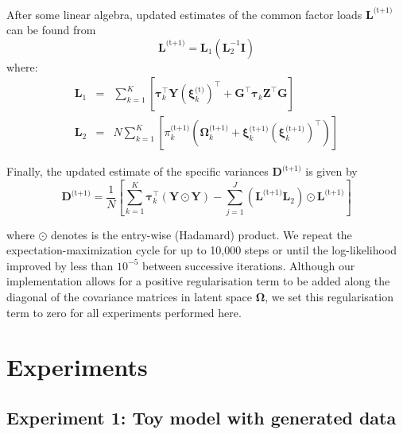 \documentclass[twocolumn]{aastex61}
\newcommand{\vect}[1]{\boldsymbol{\mathbf{#1}}}
\renewcommand{\vec}[1]{\vect{#1}}
\newcommand{\weight}{\pi}
\newcommand{\data}{\textbf{Y}}
\newcommand{\vecdata}{\vec\data}
\newcommand{\nextstep}{^\textrm{(t+1)}}
\newcommand{\thisstep}{^\textrm{(t)}}
\newcommand{\transpose}{^\intercal}
\newcommand{\eye}{\textbf{I}}
\newcommand{\factorloads}{\textbf{L}}
\newcommand{\specificvariance}{\vec{D}}
\newcommand{\scoremeans}{\vec\xi}
\newcommand{\scorecovs}{\vec\Omega}
\newcommand{\NumData}{N}
\newcommand{\NumComponents}{K}
\newcommand{\numcomponents}{k}
\begin{document}
After some linear algebra, updated estimates of the common factor loads $\factorloads\nextstep$
can be found from
\begin{equation}
	\factorloads\nextstep = \factorloads_{1}\left(\factorloads_{2}^{-1}\eye\right)
\end{equation}
\noindent{}where:
\begin{eqnarray}
	\factorloads_1 &=& \sum_{\numcomponents=1}^{\NumComponents}\left[ \vec\tau_\numcomponents\transpose\vecdata\left(\scoremeans_\numcomponents\thisstep\right)\transpose + 
	\vec{G}\transpose\vec\tau_\numcomponents\vec{Z}\transpose\vec{G}\right] \\
	\factorloads_2 &=& N\sum_{\numcomponents=1}^{\NumComponents}\left[\weight_\numcomponents\nextstep\left(\scorecovs_\numcomponents\nextstep + \scoremeans_\numcomponents\nextstep\left(\scoremeans_\numcomponents\nextstep\right)\transpose\right)\right]
\end{eqnarray}


Finally, the updated estimate of the specific variances $\specificvariance\nextstep$ is given
by
\begin{equation}
	\specificvariance\nextstep = \frac{1}{\NumData}\left[\sum^{\NumComponents}_{\numcomponents=1}\vec\tau_\numcomponents\transpose\left(\vecdata\odot\vecdata\right) - \sum_{j=1}^{J}\left(\factorloads\nextstep\factorloads_2\right)\odot\factorloads\nextstep\right]
\end{equation}

\noindent{}where $\odot$ denotes is the entry-wise (Hadamard) product. We repeat
the expectation-maximization cycle for up to 10,000 steps or until the log-likelihood
improved by less than $10^{-5}$ between successive iterations. Although our implementation
allows for a positive regularisation term to be added along the diagonal of the covariance
matrices in latent space $\scorecovs$, we set this regularisation term to zero for all
experiments performed here.


\section{Experiments} \label{sec:experiments}


\subsection{Experiment 1: Toy model with generated data} \label{sec:experiment-toy-model}
\end{document}
